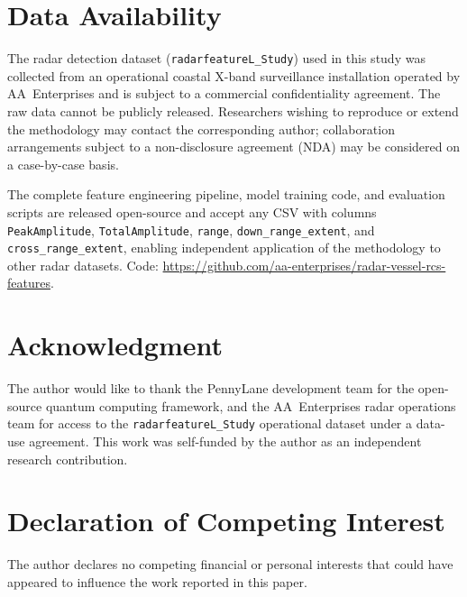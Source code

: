 \documentclass[journal]{IEEEtran}
\begin{document}
\section*{Data Availability}
The radar detection dataset (\texttt{radarfeatureL\_Study}) used in this
study was collected from an operational coastal X-band surveillance
installation operated by AA~Enterprises and is subject to a commercial
confidentiality agreement. The raw data cannot be publicly released.
Researchers wishing to reproduce or extend the methodology may contact
the corresponding author; collaboration arrangements subject to a
non-disclosure agreement (NDA) may be considered on a case-by-case basis.

The complete feature engineering pipeline, model training code, and
evaluation scripts are released open-source and accept any CSV with
columns \texttt{PeakAmplitude}, \texttt{TotalAmplitude}, \texttt{range},
\texttt{down\_range\_extent}, and \texttt{cross\_range\_extent}, enabling
independent application of the methodology to other radar datasets.
Code: \url{https://github.com/aa-enterprises/radar-vessel-rcs-features}.

\section*{Acknowledgment}
The author would like to thank the PennyLane development team for the open-source quantum computing framework, and the AA~Enterprises radar operations team for access to the \texttt{radarfeatureL\_Study} operational dataset under a data-use agreement. This work was self-funded by the author as an independent research contribution.

\section*{Declaration of Competing Interest}
The author declares no competing financial or personal interests that could have appeared to influence the work reported in this paper.
\end{document}
